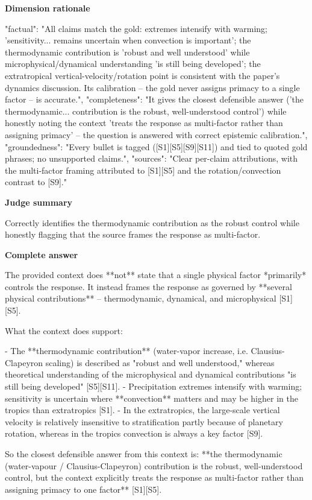 \documentclass[10pt]{article}
\begin{document}
\textbf{Dimension rationale}
\begin{EvidenceText}
{
  "factual": "All claims match the gold: extremes intensify with warming; 'sensitivity... remains uncertain when convection is important'; the thermodynamic contribution is 'robust and well understood' while microphysical/dynamical understanding 'is still being developed'; the extratropical vertical-velocity/rotation point is consistent with the paper's dynamics discussion. Its calibration -- the gold never assigns primacy to a single factor -- is accurate.",
  "completeness": "It gives the closest defensible answer ('the thermodynamic... contribution is the robust, well-understood control') while honestly noting the context 'treats the response as multi-factor rather than assigning primacy' -- the question is answered with correct epistemic calibration.",
  "groundedness": "Every bullet is tagged ([S1][S5][S9][S11]) and tied to quoted gold phrases; no unsupported claims.",
  "sources": "Clear per-claim attributions, with the multi-factor framing attributed to [S1][S5] and the rotation/convection contrast to [S9]."
}
\end{EvidenceText}

\textbf{Judge summary}
\begin{EvidenceText}
Correctly identifies the thermodynamic contribution as the robust control while honestly flagging that the source frames the response as multi-factor.
\end{EvidenceText}

\textbf{Complete answer}
\begin{AnswerText}
The provided context does **not** state that a single physical factor *primarily* controls the response. It instead frames the response as governed by **several physical contributions** -- thermodynamic, dynamical, and microphysical [S1][S5].

What the context does support:

- The **thermodynamic contribution** (water-vapor increase, i.e. Clausius-Clapeyron scaling) is described as "robust and well understood," whereas theoretical understanding of the microphysical and dynamical contributions "is still being developed" [S5][S11].
- Precipitation extremes intensify with warming; sensitivity is uncertain where **convection** matters and may be higher in the tropics than extratropics [S1].
- In the extratropics, the large-scale vertical velocity is relatively insensitive to stratification partly because of planetary rotation, whereas in the tropics convection is always a key factor [S9].

So the closest defensible answer from this context is: **the thermodynamic (water-vapour / Clausius-Clapeyron) contribution is the robust, well-understood control, but the context explicitly treats the response as multi-factor rather than assigning primacy to one factor** [S1][S5].
\end{AnswerText}
\end{document}
